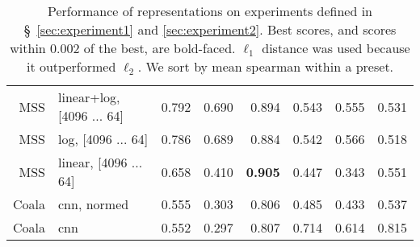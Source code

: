 \begin{table}[ht]
\begin{tabular}{rlrrrrrr}
MSS \cite{engel2020ddsp,steinmetz2020auraloss} & linear+log, [4096 ... 64] &         0.792 &           0.690 &              0.894 &             0.543 &              0.555 &                 0.531 \\
MSS \cite{engel2020ddsp,steinmetz2020auraloss} & log, [4096 ... 64] &         0.786 &           0.689 &              0.884 &             0.542 &              0.566 &                 0.518 \\
MSS \cite{engel2020ddsp,steinmetz2020auraloss} & linear, [4096 ... 64] &          0.658 &           0.410 &              \textbf{0.905} &             0.447 &              0.343 &                 0.551 \\
Coala \cite{drossos:icml:2020} & cnn, normed &          0.555 &           0.303 &              0.806 &             0.485 &              0.433 &                 0.537 \\
Coala \cite{drossos:icml:2020} & cnn &         0.552 &           0.297 &              0.807 &             0.714 &              0.614 &                 0.815 \\
 \end{tabular}
  \caption{Performance of representations on experiments defined in \S~\ref{sec:experiment1} and \ref{sec:experiment2}. Best scores, and scores within 0.002 of the best, are bold-faced. $\ell_1$ distance was used because it outperformed $\ell_2$. We sort by mean spearman within a preset.
  }
  \label{tab:distance-eval}
\end{table}
